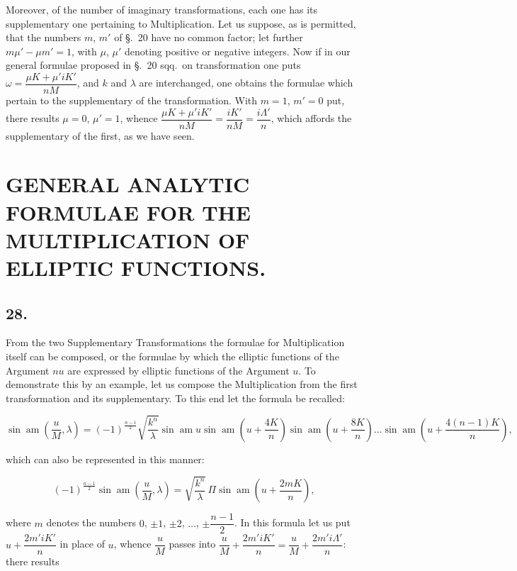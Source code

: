 \documentclass{article}
\begin{document}
Moreover, of the number of imaginary transformations, each one has its supplementary one pertaining to Multiplication. Let us suppose, as is permitted, that the numbers $m$, $m'$ of §.\ 20 have no common factor; let further $m\mu'-\mu m'=1$, with $\mu$, $\mu'$ denoting positive or negative integers. Now if in our general formulae proposed in §.\ 20 sqq.\ on transformation one puts $\omega=\dfrac{\mu K+\mu' iK'}{nM}$, and $k$ and $\lambda$ are interchanged, one obtains the formulae which pertain to the supplementary of the transformation. With $m=1$, $m'=0$ put, there results $\mu=0$, $\mu'=1$, whence $\dfrac{\mu K+\mu' iK'}{nM}=\dfrac{iK'}{nM}=\dfrac{i\Lambda'}{n}$, which affords the supplementary of the first, as we have seen.

\section*{GENERAL ANALYTIC FORMULAE FOR THE MULTIPLICATION OF ELLIPTIC FUNCTIONS.}

\subsection*{28.}

From the two Supplementary Transformations the formulae for Multiplication itself can be composed, or the formulae by which the elliptic functions of the Argument $nu$ are expressed by elliptic functions of the Argument $u$. To demonstrate this by an example, let us compose the Multiplication from the first transformation and its supplementary. To this end let the formula be recalled:

\[
\sin\operatorname{am}\left(\frac{u}{M},\lambda\right)=(-1)^{\frac{n-1}{2}}\sqrt{\frac{k^{n}}{\lambda}}\sin\operatorname{am}u\sin\operatorname{am}\left(u+\frac{4K}{n}\right)\sin\operatorname{am}\left(u+\frac{8K}{n}\right)\ldots\sin\operatorname{am}\left(u+\frac{4(n-1)K}{n}\right),
\]

which can also be represented in this manner:

\[
(-1)^{\frac{n-1}{2}}\sin\operatorname{am}\left(\frac{u}{M},\lambda\right)=\sqrt{\frac{k^{n}}{\lambda}}\,\Pi\sin\operatorname{am}\left(u+\frac{2mK}{n}\right),
\]

where $m$ denotes the numbers $0$, $\pm1$, $\pm2$, $\ldots$, $\pm\dfrac{n-1}{2}$. In this formula let us put $u+\dfrac{2m'iK'}{n}$ in place of $u$, whence $\dfrac{u}{M}$ passes into $\dfrac{u}{M}+\dfrac{2m'iK'}{n}=\dfrac{u}{M}+\dfrac{2m'i\Lambda'}{n}$: there results
\end{document}
